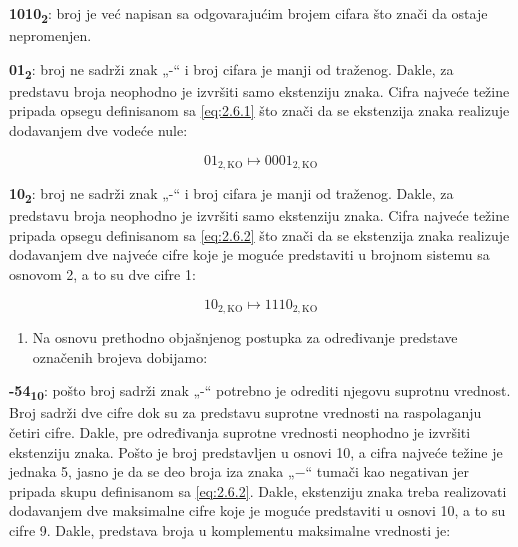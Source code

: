\documentclass[a4paper,11pt]{article}
\numberwithin{equation}{section}
\begin{document}
\textbf{1010\textsubscript{2}}: broj je već napisan sa odgovarajućim brojem cifara što znači da ostaje nepromenjen.



\textbf{01\textsubscript{2}}: broj ne sadrži znak „-“ i broj cifara je manji od traženog. Dakle, za predstavu broja neophodno je izvršiti samo ekstenziju znaka. Cifra najveće težine pripada opsegu definisanom sa \eqref{eq:2.6.1} što znači da se ekstenzija znaka realizuje dodavanjem dve vodeće nule:



\begin{equation}\label{eq:2.6.5}
01_{2,\mathrm{KO}} \longmapsto 0001_{2,\mathrm{KO}}
\end{equation}


\textbf{10\textsubscript{2}}: broj ne sadrži znak „-“ i broj cifara je manji od traženog. Dakle, za predstavu broja neophodno je izvršiti samo ekstenziju znaka. Cifra najveće težine pripada opsegu definisanom sa \eqref{eq:2.6.2} što znači da se ekstenzija znaka realizuje dodavanjem dve najveće cifre koje je moguće predstaviti u brojnom sistemu sa osnovom 2, a to su dve cifre 1:



\begin{equation}\label{eq:2.6.6}
10_{2,\mathrm{KO}} \longmapsto 1110_{2,\mathrm{KO}}
\end{equation}


\begin{enumerate}[label=\alph*),start=2,leftmargin=*]
\item Na osnovu prethodno objašnjenog postupka za određivanje predstave označenih brojeva dobijamo:

\end{enumerate}


\textbf{-54\textsubscript{10}}: pošto broj sadrži znak „-“ potrebno je odrediti njegovu suprotnu vrednost. Broj sadrži dve cifre dok su za predstavu suprotne vrednosti na raspolaganju četiri cifre. Dakle, pre određivanja suprotne vrednosti neophodno je izvršiti ekstenziju znaka. Pošto je broj predstavljen u osnovi 10, a cifra najveće težine je jednaka 5, jasno je da se deo broja iza znaka „$-$“ tumači kao negativan jer pripada skupu definisanom sa \eqref{eq:2.6.2}. Dakle, ekstenziju znaka treba realizovati dodavanjem dve maksimalne cifre koje je moguće predstaviti u osnovi 10, a to su cifre 9. Dakle, predstava broja u komplementu maksimalne vrednosti je:
\end{document}
